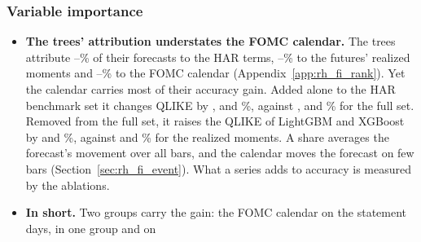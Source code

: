 \subsubsection{Variable importance}
\label{sec:rh_fi_use}
\begin{itemize}
\item \textbf{The trees' attribution understates the FOMC calendar.} The trees attribute
  \rhfipHarMin--\rhfipHarMax\% of their forecasts to the HAR terms, \rhfipMomMin--\rhfipMomMax\% to the futures'
  realized moments and \rhfipFomcBucketMin--\rhfipFomcBucketMax\% to the FOMC calendar
  (Appendix~\ref{app:rh_fi_rank}). Yet the calendar carries most of their accuracy gain. Added alone to the HAR
  benchmark set it changes QLIKE by \rhabLgbmAddFomcAllPct, \rhabXgbAddFomcAllPct{} and \rhabRfAddFomcAllPct\%,
  against \rhabLgbmFullAllPct, \rhabXgbFullAllPct{} and \rhabRfFullAllPct\% for the full set. Removed from the full
  set, it raises the QLIKE of LightGBM and XGBoost by \rhabLgbmLoFomcAllPct{} and \rhabXgbLoFomcAllPct\%, against
  \rhabLgbmLoRmAllPct{} and \rhabXgbLoRmAllPct\% for the realized moments. A share averages the forecast's movement
  over all bars, and the calendar moves the forecast on few bars (Section~\ref{sec:rh_fi_event}). What a series adds
  to accuracy is measured by the ablations.
\item \textbf{In short.} Two groups carry the gain: the FOMC calendar on the statement days, in one group and on

\end{itemize}
